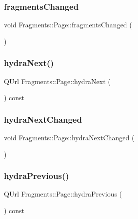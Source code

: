 \subsubsection{\texorpdfstring{fragments\+Changed}{fragmentsChanged}}
{\footnotesize\ttfamily void Fragments\+::\+Page\+::fragments\+Changed (\begin{DoxyParamCaption}{ }\end{DoxyParamCaption})\hspace{0.3cm}{\ttfamily [signal]}}

\mbox{\label{classFragments_1_1Page_a822bbc500bf1e5540582cdf258d73b20}} 
\subsubsection{\texorpdfstring{hydra\+Next()}{hydraNext()}}
{\footnotesize\ttfamily Q\+Url Fragments\+::\+Page\+::hydra\+Next (\begin{DoxyParamCaption}{ }\end{DoxyParamCaption}) const}

\mbox{\label{classFragments_1_1Page_a0b56ee63d18b43654cdfebd6a39c8d4f}} 
\subsubsection{\texorpdfstring{hydra\+Next\+Changed}{hydraNextChanged}}
{\footnotesize\ttfamily void Fragments\+::\+Page\+::hydra\+Next\+Changed (\begin{DoxyParamCaption}{ }\end{DoxyParamCaption})\hspace{0.3cm}{\ttfamily [signal]}}

\mbox{\label{classFragments_1_1Page_a102aada029299dbe7f8b55116eda0933}} 
\subsubsection{\texorpdfstring{hydra\+Previous()}{hydraPrevious()}}
{\footnotesize\ttfamily Q\+Url Fragments\+::\+Page\+::hydra\+Previous (\begin{DoxyParamCaption}{ }\end{DoxyParamCaption}) const}

